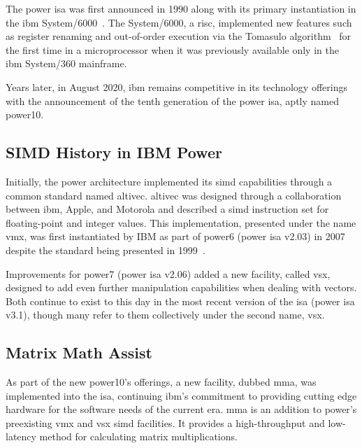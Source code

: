 \documentclass[\main/thesis.tex]{subfiles}
\begin{document}
The \gls{power} \gls{isa} was first announced in 1990 along with its primary instantiation in the \gls{ibm} System/6000~\autocite{montoye1990design}.
The System/6000, a \gls{risc}, implemented new features such as register renaming and out-of-order execution via the Tomasulo algorithm~\autocite{tomasulo1967efficient}  for the first time in a microprocessor when it was previously available only in the \gls{ibm} System/360 mainframe.

Years later, in August 2020, \gls{ibm} remains competitive in its technology offerings with the announcement of the tenth generation of the \gls{power} \gls{isa}, aptly named \gls{power10}.

\subsection{SIMD History in IBM Power}
Initially, the \gls{power} architecture implemented its \gls{simd} capabilities through a common standard named \gls{altivec}.
\Gls{altivec} was designed through a collaboration between \gls{ibm}, Apple, and Motorola and described a \gls{simd} instruction set for floating-point and integer values.
This implementation, presented under the name \gls{vmx}, was first instantiated by IBM as part of \gls{power}6 (\gls{power} \gls{isa} v2.03) in 2007~\autocite{eisen2007ibm} despite the standard being presented in 1999~\autocite{tyler1999altivec}.

Improvements for \gls{power}7 (\gls{power} \gls{isa} v2.06) added a new facility, called \gls{vsx}, designed to add even further manipulation capabilities when dealing with vectors.
Both continue to exist to this day in the most recent version of the \gls{isa} (\gls{power} \gls{isa} v3.1), though many refer to them collectively under the second name, \gls{vsx}.

\subsection{Matrix Math Assist}
\label{sec:mmaintro}
As part of the new \gls{power10}'s offerings, a new facility, dubbed \gls{mma}, was implemented into the \gls{isa}, continuing \gls{ibm}'s commitment to providing cutting edge hardware for the software needs of the current era.
\gls{mma} is an addition to \gls{power}'s preexisting \gls{vmx} and \gls{vsx} \gls{simd} facilities.
It provides a high-throughput and low-latency method for calculating matrix multiplications.
\end{document}
